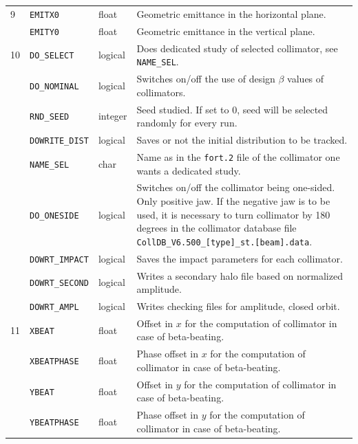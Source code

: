 \begin{center}
\begin{longtable}{| p{0.5cm} | p{2.4cm} | p{1.2cm} | >{\raggedright\arraybackslash}p{11.4cm}|}
    9   & \texttt{EMITX0}        & float   & Geometric emittance in the horizontal plane. \\
        \cline{2-4}
        & \texttt{EMITY0}        & float   & Geometric emittance in the vertical plane. \\
    \hline

    10  & \texttt{DO\_SELECT}    & logical & Does dedicated study of selected collimator, see \texttt{NAME\_SEL}. \\
        \cline{2-4}
        & \texttt{DO\_NOMINAL}   & logical & Switches on/off the use of design $\beta$ values of collimators. \\
        \cline{2-4}
        & \texttt{RND\_SEED}     & integer & Seed studied. If set to 0, seed will be selected randomly for every run. \\
        \cline{2-4}
        & \texttt{DOWRITE\_DIST} & logical & Saves or not the initial distribution to be tracked. \\
        \cline{2-4}
        & \texttt{NAME\_SEL}     & char    & Name as in the \texttt{fort.2} file of the collimator one wants a dedicated study. \\
        \cline{2-4}
        & \texttt{DO\_ONESIDE}   & logical & Switches on/off the collimator being one-sided. Only positive jaw. If the negative jaw is to be used, it is necessary to turn collimator by 180 degrees in the collimator database file \texttt{CollDB\_V6.500\_[type]\_st.[beam].data}. \\
        \cline{2-4}
        & \texttt{DOWRT\_IMPACT} & logical & Saves the impact parameters for each collimator. \\
        \cline{2-4}
        & \texttt{DOWRT\_SECOND} & logical & Writes a secondary halo file based on normalized amplitude. \\
        \cline{2-4}
        & \texttt{DOWRT\_AMPL}   & logical & Writes checking files for amplitude, closed orbit. \\
    \hline

    11  & \texttt{XBEAT}         & float   & Offset in $x$ for the computation of collimator in case of beta-beating\index{beta-beating}. \\
        \cline{2-4}
        & \texttt{XBEATPHASE}    & float   & Phase offset in $x$ for the computation of collimator in case of beta-beating\index{beta-beating}. \\
        \cline{2-4}
        & \texttt{YBEAT}         & float   & Offset in $y$ for the computation of collimator in case of beta-beating\index{beta-beating}. \\
        \cline{2-4}
        & \texttt{YBEATPHASE}    & float   & Phase offset in $y$ for the computation of collimator in case of beta-beating\index{beta-beating}. \\
    \hline


\end{longtable}
\end{center}
